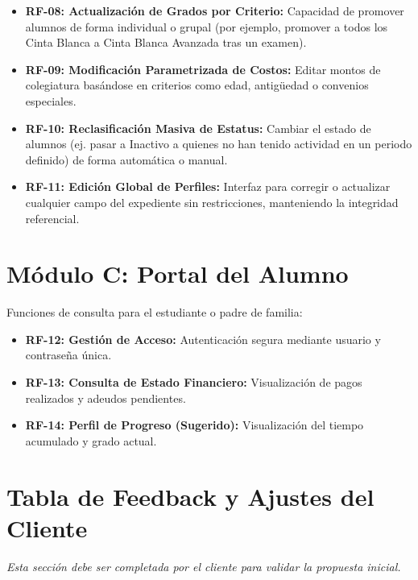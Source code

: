 \documentclass[12pt,a4paper]{article}
\begin{document}
	\begin{itemize}[label=$\square$]
		\item \textbf{RF-08: Actualización de Grados por Criterio:} Capacidad de promover alumnos de forma individual o grupal (por ejemplo, promover a todos los Cinta Blanca a Cinta Blanca Avanzada tras un examen).
		\item \textbf{RF-09: Modificación Parametrizada de Costos:} Editar montos de colegiatura basándose en criterios como edad, antigüedad o convenios especiales.
		\item \textbf{RF-10: Reclasificación Masiva de Estatus:} Cambiar el estado de alumnos (ej. pasar a Inactivo a quienes no han tenido actividad en un periodo definido) de forma automática o manual.
		\item \textbf{RF-11: Edición Global de Perfiles:} Interfaz para corregir o actualizar cualquier campo del expediente sin restricciones, manteniendo la integridad referencial.
	\end{itemize}
	
	\section{Módulo C: Portal del Alumno}
	Funciones de consulta para el estudiante o padre de familia:
	
	\begin{itemize}[label=$\square$]
		\item \textbf{RF-12: Gestión de Acceso:} Autenticación segura mediante usuario y contraseña única.
		\item \textbf{RF-13: Consulta de Estado Financiero:} Visualización de pagos realizados y adeudos pendientes.
		\item \textbf{RF-14: Perfil de Progreso (Sugerido):} Visualización del tiempo acumulado y grado actual.
	\end{itemize}
	
	\newpage
	
	\section{Tabla de Feedback y Ajustes del Cliente}
	\textit{Esta sección debe ser completada por el cliente para validar la propuesta inicial.}
	
\end{document}
